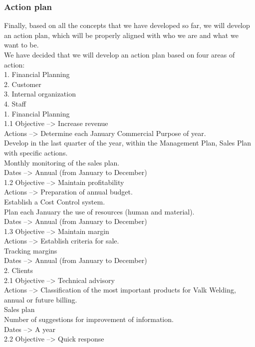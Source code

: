 \subsubsection{Action plan}
Finally, based on all the concepts that we have developed so far, we will develop an action plan, which will be properly aligned with who we are and what we want to be.\\
We have decided that we will develop an action plan based on four areas of action:\\
	1. Financial Planning\\
	2. Customer\\
	3. Internal organization\\
	4. Staff\\
1. Financial Planning\\
1.1 Objective --> Increase revenue\\
	Actions --> Determine each January Commercial Purpose of year.\\
				Develop in the last quarter of the year, within the Management Plan, Sales Plan with specific actions.\\
				Monthly monitoring of the sales plan.\\
	Dates --> Annual (from January to December)\\
1.2 Objective --> Maintain profitability\\
	Actions --> Preparation of annual budget.\\
				Establish a Cost Control system.\\
				Plan each January the use of resources (human and material).\\
	Dates --> Annual (from January to December)\\
1.3 Objective --> Maintain margin\\
	Actions --> Establish criteria for sale.\\
				Tracking margins\\
	Dates --> Annual (from January to December)\\
2. Clients\\
2.1 Objective --> Technical advisory\\
	Actions --> Classification of the most important products for Valk Welding, annual or future billing.\\
				Sales plan\\
				Number of suggestions for improvement of information.\\
	Dates --> A year\\
2.2 Objective --> Quick response\\
